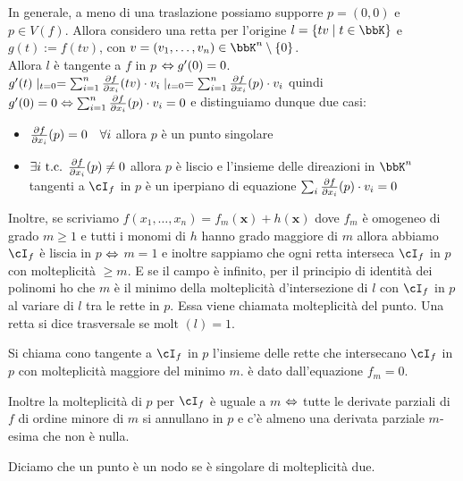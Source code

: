 \documentclass[a4paper,NoNotes,GeneralMath]{stdmdoc}
\newcommand{\Molt}{\text{molt }}
\begin{document}
	\vskip 1.2cm
	
	In generale, a meno di una traslazione possiamo supporre $p = (0,0)$ e $p \in V(f)$. Allora considero una retta per l'origine $l= \{ tv \mid t \in \bbK \}$ e $g(t) := f(tv)$, con $v = (v_1, \ldots, v_n) \in \bbK^n \setminus \{0\}$. \\
	Allora $l$ è tangente a $f$ in $p$ $\Leftrightarrow g'(0) = 0$. $g'(t)\mid_{t=0} = \sum_{i=1}^n \dpar{f}{x_i} (tv) \cdot v_i \mid_{t=0} = \sum_{i=1}^{n} \dpar{f}{x_i} (p) \cdot v_i$ quindi $g'(0) = 0 \sse \sum_{i=1}^{n} \dpar{f}{x_i} (p) \cdot v_i = 0$ e distinguiamo dunque due casi:
	\begin{itemize}
		\item $\dpar{f}{x_i} (p) = 0 \quad \forall i$ allora $p$ è un punto singolare
		\item $\exists i \tc \dpar{f}{x_i} (p) \neq 0$ allora $p$ è liscio e l'insieme delle direazioni in $\bbK^n$ tangenti a $\cI_f$ in $p$ è un iperpiano di equazione $\sum_i \dpar{f}{x_i} (p) \cdot v_i = 0$
	\end{itemize}

	\vskip 1.2cm

	Inoltre, se scriviamo $f(x_1, \ldots, x_n) = f_m(\bm x) + h(\bm x)$ dove $f_m$ è omogeneo di grado $m \ge 1$ e tutti i monomi di $h$ hanno grado maggiore di $m$ allora abbiamo $\cI_f$ è liscia in $p$ $\Leftrightarrow$ $m = 1$ e inoltre sappiamo che ogni retta interseca $\cI_f$ in $p$ con molteplicità $\ge m$. E se il campo è infinito, per il principio di identità dei polinomi ho che $m$ è il minimo della molteplicità d'intersezione di $l$ con $\cI_f$ in $p$ al variare di $l$ tra le rette in $p$. Essa viene chiamata molteplicità del punto.
	Una retta si dice trasversale se $\Molt (l) = 1$.

	Si chiama cono tangente a $\cI_f$ in $p$ l'insieme delle rette che intersecano $\cI_f$ in $p$ con molteplicità maggiore del minimo $m$. è dato dall'equazione $f_m = 0$.

	Inoltre la molteplicità di $p$ per $\cI_f$ è uguale a $m$ $\Leftrightarrow$ tutte le derivate parziali di $f$ di ordine minore di $m$ si annullano in $p$ e c'è almeno una derivata parziale $m$-esima che non è nulla.

	Diciamo che un punto è un nodo se è singolare di molteplicità due.
\end{document}
